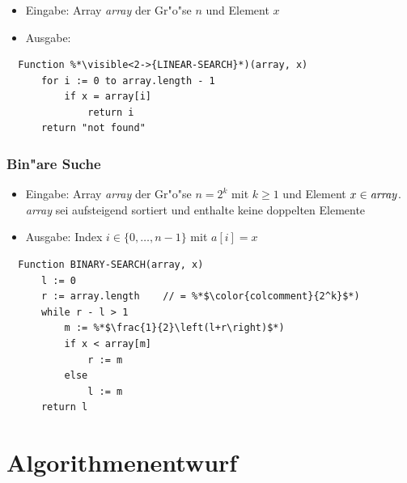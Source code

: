\begin{frame}[fragile]
  \frametitle{}
  \begin{itemize}
  \item Eingabe: Array \emph{array} der Gr"o"se $n$ und Element $x$
  \item Ausgabe: 
  \end{itemize}
  \begin{lstlisting}
  Function %*\visible<2->{LINEAR-SEARCH}*)(array, x)
      for i := 0 to array.length - 1
          if x = array[i]
              return i
      return "not found"
  \end{lstlisting}
\end{frame}

\begin{frame}[fragile]
  \frametitle{Bin"are Suche}
  \begin{itemize}
  \item Eingabe: Array \emph{array} der Gr"o"se $n = 2^k$ mit $k \geq 1$ und Element
                 $x \in \text{\emph{array}}$. \\
                 \emph{array} sei aufsteigend sortiert und enthalte
                 keine doppelten Elemente
  \item Ausgabe: Index $i \in \{0,\ldots,n-1\}$ mit $a[i] = x$
  \end{itemize}
  \begin{lstlisting}
  Function BINARY-SEARCH(array, x)
      l := 0
      r := array.length    // = %*$\color{colcomment}{2^k}$*)
      while r - l > 1
          m := %*$\frac{1}{2}\left(l+r\right)$*)
          if x < array[m]
              r := m
          else
              l := m
      return l
  \end{lstlisting}
\end{frame}

\section{Algorithmenentwurf}
